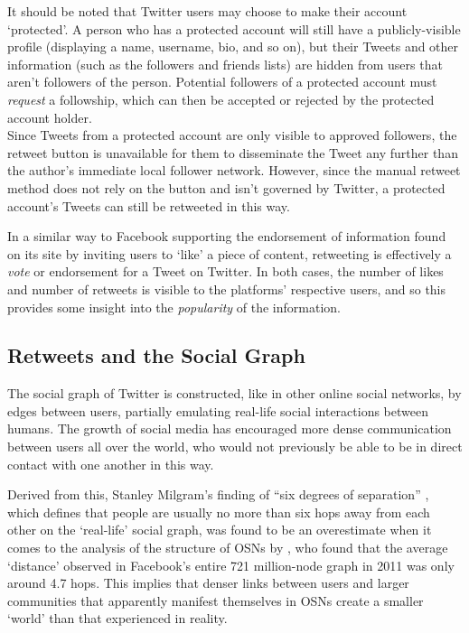 It should be noted that Twitter users may choose to make their account `protected'. A person who has a protected account will still have a publicly-visible profile (displaying a name, username, bio, and so on), but their Tweets and other information (such as the followers and friends lists) are hidden from users that aren't followers of the person. Potential followers of a protected account must \textit{request} a followship, which can then be accepted or rejected by the protected account holder. \\
Since Tweets from a protected account are only visible to approved followers, the retweet button is unavailable for them to disseminate the Tweet any further than the author's immediate local follower network. However, since the manual retweet method does not rely on the button and isn't governed by Twitter, a protected account's Tweets can still be retweeted in this way.

In a similar way to Facebook supporting the endorsement of information found on its site by inviting users to `like' a piece of content, retweeting is effectively a \textit{vote} or endorsement for a Tweet on Twitter. In both cases, the number of likes and number of retweets is visible to the platforms' respective users, and so this provides some insight into the \textit{popularity} of the information.\\


\subsection{Retweets and the Social Graph}
The social graph of Twitter is constructed, like in other online social networks, by edges between users, partially emulating real-life social interactions between humans. The growth of social media has encouraged more dense communication between users all over the world, who would not previously be able to be in direct contact with one another in this way.

Derived from this, Stanley Milgram's finding of ``six degrees of separation'' \cite{milgram67}, which defines that people are usually no more than six hops away from each other on the `real-life' social graph, was found to be an overestimate when it comes to the analysis of the structure of OSNs by \cite{backstrom11}, who found that the average `distance' observed in Facebook's entire 721 million-node graph in 2011 was only around 4.7 hops. This implies that denser links between users and larger communities that apparently manifest themselves in OSNs create a smaller `world' than that experienced in reality.

